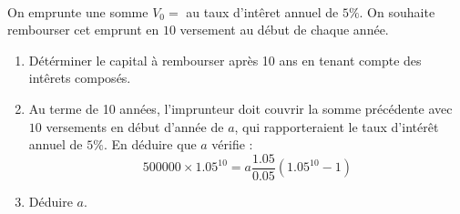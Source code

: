 \documentclass[main.tex]{subfiles}
\begin{document}
\begin{problem}\label{chapter05:exercise:suites49}\hfill \\
On emprunte une somme $V_0 =$ au taux d'intêret annuel de $5\%$. On souhaite rembourser cet emprunt en $10$ versement au début de chaque année.
\begin{enumerate}[leftmargin=*,label=\arabic*)]
	\item Détérminer le capital à rembourser après 10 ans en tenant compte des intêrets composés.
	\item Au terme de 10 années, l'imprunteur doit couvrir la somme précédente avec $10$ versements en début d'année de $a$, qui rapporteraient le taux d'intérêt annuel de $5\%$. En déduire que $a$ vérifie :
	\setlength{\abovedisplayskip}{3pt}
	\setlength{\belowdisplayskip}{3pt}
	\[
	500000\times 1.05^{10}=a\frac{1.05}{0.05}\left( 1.05^{10}-1 \right)
	\]
	\item Déduire $a$.
\end{enumerate} 
\end{problem}
\end{document}
